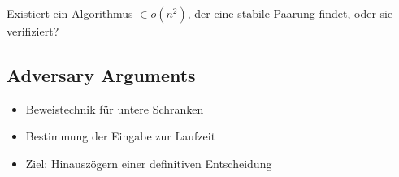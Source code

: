 \begin{frame}
  \begin{center}
    Existiert ein Algorithmus $\in o(n^2)$, der eine stabile Paarung findet, oder sie verifiziert?
  \end{center}
\end{frame}

\subsection{Adversary Arguments}
\begin{frame}
\begin{figure}
    \centering
    \def\svgwidth{0.69\columnwidth}
    
\end{figure}
\end{frame}


\begin{frame}
\begin{itemize}[<+->]
	\item Beweistechnik für untere Schranken
	\item Bestimmung der Eingabe zur Laufzeit
	\item Ziel: Hinauszögern einer definitiven Entscheidung
\end{itemize}
\end{frame}

